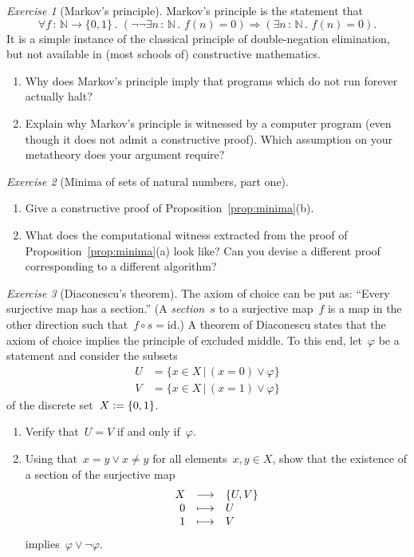 \documentclass[10pt,reqno,a4paper,openany]{amsbook}
\theoremstyle{definition}
\theoremstyle{plain}
\theoremstyle{remark}
\newcommand{\NN}{\mathbb{N}}
\newcommand{\?}{\,{:}\,}
\renewcommand{\_}{\mathpunct{.}\,}
\newcommand{\defeq}{\vcentcolon=}
\newtheorem{exercise}{Exercise}[chapter]
\begin{document}
\begin{exercise}[Markov's principle]\label{ex:markov}
Markov's principle is the statement that
\[ \forall f \? \NN \to \{0,1\}\_ (\neg\neg\exists n \? \NN\_ f(n) = 0)
\Rightarrow (\exists n \? \NN\_ f(n) = 0). \]
It is a simple instance of the classical principle of double-negation
elimination, but not available in (most schools of) constructive mathematics.
\begin{enumerate}
\item Why does Markov's principle imply that programs which do not run forever
actually halt?
\item Explain why Markov's principle is witnessed by a computer program (even
though it does not admit a constructive proof). Which assumption on your
metatheory does your argument require?
\end{enumerate}
\end{exercise}

\begin{exercise}[Minima of sets of natural numbers, part one]\label{ex:minima1}
\begin{enumerate}
\item Give a constructive proof of Proposition~\ref{prop:minima}(b).
\item What does the computational witness extracted from the proof of
Proposition~\ref{prop:minima}(a) look like? Can you devise a different proof
corresponding to a different algorithm?
\end{enumerate}
\end{exercise}

\begin{exercise}[Diaconescu's theorem]
\label{ex:diaconescu}
The axiom of choice can be put as: ``Every surjective map has a
section.'' (A \emph{section}~$s$ to a surjective map~$f$ is a map in the other direction such that~$f \circ s =
\mathrm{id}$.) A theorem of Diaconescu states that
the axiom of choice implies the principle of excluded middle. To this end, let~$\varphi$ be a
statement and consider the subsets
\begin{align*}
  U &= \{ x \in X \,|\, (x = 0) \vee \varphi \} \\
  V &= \{ x \in X \,|\, (x = 1) \vee \varphi \}
\end{align*}
of the discrete set~$X \defeq \{ 0,1 \}$.
\begin{enumerate}
\item Verify that~$U = V$ if and only if~$\varphi$.
\item Using that~$x = y \vee x \neq y$ for all elements~$x,y \in X$, show that
the existence of a section of the surjective map
\[ \begin{array}{@{}rcl@{}}
  X &\longrightarrow& \{U,V\} \\
  0 &\longmapsto& U \\
  1 &\longmapsto& V
\end{array} \]
implies~$\varphi \vee \neg\varphi$.
\end{enumerate}
\end{exercise}
\end{document}
